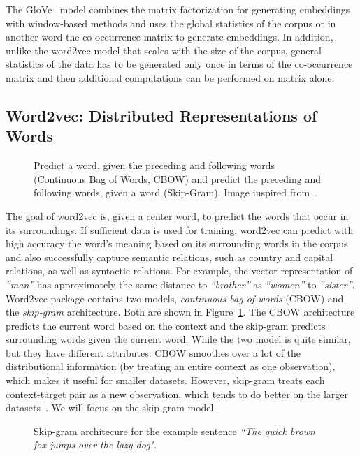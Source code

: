 The GloVe~ model combines the matrix factorization for generating embeddings with window-based methods and uses the global statistics of the corpus or in another word the co-occurrence matrix to generate embeddings. In addition, unlike the word2vec model that scales with the size of the corpus, general statistics of the data has to be generated only once in terms of the co-occurrence matrix and then additional computations can be performed on matrix alone.
\subsection{Word2vec: Distributed Representations of Words }
\label{subsec:word2vec}
\begin{figure}
\centering 
\resizebox{0.63\textwidth}{0.5\textwidth}{      

}
\caption{Predict a word, given the preceding and following words (Continuous Bag of Words, CBOW) and predict the preceding and following words, given a word (Skip-Gram). Image inspired from~.}
\label{fig:w2v}
\end{figure}
The goal of word2vec is, given a center word, to predict the words that occur in its surroundings. If sufficient data is used for training, word2vec can predict with high accuracy the word's meaning based on its surrounding words in the corpus and also successfully capture semantic relations, such as country and capital relations, as well as syntactic relations. For example, the vector representation of  \emph{``man''} has approximately the same distance to  \emph{``brother''} as \emph{``women''} to \emph{``sister''}. \\
Word2vec package contains two models, \emph{continuous bag-of-words} (CBOW) and the \emph{skip-gram} architecture. Both are shown in Figure~\ref{fig:w2v}. The CBOW architecture predicts the current word based on the context and the skip-gram predicts surrounding words given the current word. While the two model is quite similar, but they have different attributes. CBOW smoothes over a lot of the distributional information (by treating an entire context as one observation), which makes it useful for smaller datasets.  However, skip-gram treats each context-target pair as a new observation, which tends to do better on the larger datasets~. We will focus on the skip-gram model. \\
\begin{figure}
\centering 
\resizebox{0.8\textwidth}{0.5\textwidth}{      

}
\caption{Skip-gram architecure for the example sentence \emph{``The quick brown fox jumps over the lazy dog"}. }
\label{fig:skip_w2v}
\end{figure}
